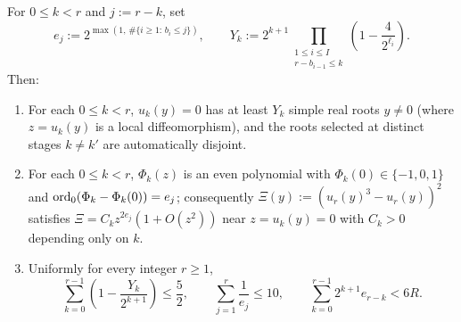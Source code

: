 \begin{lemma}\label{lem:recurrent-folds}
For $0\le k<r$ and $j:=r-k$, set
\begin{equation}\label{eq:ej-Yk}
  e_j := 2^{\max(1,\,\#\{i\ge 1:\, b_i\le j\})}, \qquad
  Y_k := 2^{k+1}\prod_{\substack{1\le i\le I \\ r-b_{i-1}\le k}} \left(1 - \frac{4}{2^{\ell_i}}\right).
\end{equation}
Then:
\begin{enumerate}[label=(\alph*),nosep]
  \item For each $0\le k<r$, $u_k(y)=0$ has at least $Y_k$ simple real roots $y\ne 0$ (where $z=u_k(y)$ is a local diffeomorphism), and the roots selected at distinct stages $k\ne k'$ are automatically disjoint.
  \item For each $0\le k<r$, $\Phi_k(z)$ is an even polynomial with $\Phi_k(0)\in\{-1,0,1\}$ and $\operatorname{ord}_0(\Phi_k-\Phi_k(0))=e_j$; consequently $\Xi(y):=(u_r(y)^3-u_r(y))^2$ satisfies $\Xi=C_k z^{2e_j}(1+O(z^2))$ near $z=u_k(y)=0$ with $C_k>0$ depending only on $k$.
  \item Uniformly for every integer $r\ge 1$,
  \begin{equation}\label{eq:fold-sums}
    \sum_{k=0}^{r-1}\left(1-\frac{Y_k}{2^{k+1}}\right) \le \frac52, \qquad
    \sum_{j=1}^r \frac{1}{e_j} \le 10, \qquad
    \sum_{k=0}^{r-1} 2^{k+1} e_{r-k} < 6R.
  \end{equation}
\end{enumerate}
\end{lemma}

